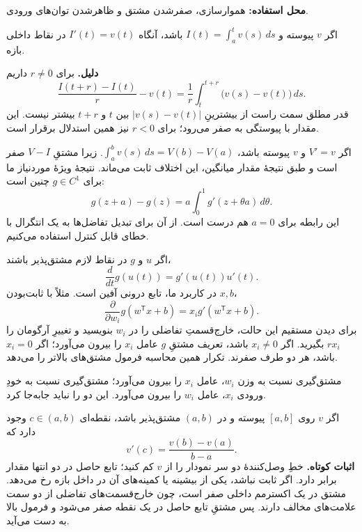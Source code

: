 \textbf{محل استفاده:} هموارسازی، صفرشدن مشتق و ظاهرشدن توان‌های ورودی.

اگر $v$ پیوسته و $I(t)=\int_a^t v(s)\,ds$ باشد، آنگاه $I'(t)=v(t)$ در نقاط داخلی بازه.

\textbf{دلیل.} برای $r\neq0$ داریم
\[
\frac{I(t+r)-I(t)}{r}-v(t)
=\frac1r\int_t^{t+r}\bigl(v(s)-v(t)\bigr)\,ds.
\]
قدر مطلق سمت راست از بیشترینِ $|v(s)-v(t)|$ بین $t$ و $t+r$ بیشتر نیست. این مقدار با پیوستگی به صفر می‌رود؛ برای $r<0$ نیز همین استدلال برقرار است.

اگر $V'=v$ و $v$ پیوسته باشد، $\int_a^b v(s)\,ds=V(b)-V(a)$. زیرا مشتقِ $V-I$ صفر است و طبق نتیجهٔ مقدار میانگین، این اختلاف ثابت می‌ماند. نتیجهٔ ویژهٔ موردنیاز ما برای $g\in C^1$ چنین است:
\begin{equation}\label{eq:ftc-difference}
 g(z+a)-g(z)=a\int_0^1g'(z+\theta a)\,d\theta.
\end{equation}
این رابطه برای $a=0$ هم درست است. از آن برای تبدیل تفاضل‌ها به یک انتگرال با خطای قابل کنترل استفاده می‌کنیم.

اگر $u$ و $g$ در نقاط لازم مشتق‌پذیر باشند،
\[
\frac{d}{dt}g(u(t))=g'(u(t))u'(t).
\]
در کاربرد ما، تابع درونی آفین است. مثلاً با ثابت‌بودن $x,b$،
\[
\frac{\partial}{\partial w_i}g(w^{\mathsf T}x+b)
=x_i g'(w^{\mathsf T}x+b).
\]
برای دیدن مستقیم این حالت، خارج‌قسمتِ تفاضلی را در $w_i$ بنویسید و تغییرِ آرگومان را $rx_i$ بگیرید. اگر $x_i\neq0$ باشد، تعریف مشتقِ $g$ عامل $x_i$ را بیرون می‌آورد؛ اگر $x_i=0$ باشد، هر دو طرف صفرند. تکرار همین محاسبه فرمول مشتق‌های بالاتر را می‌دهد.

\begin{intuition}
مشتق‌گیری نسبت به وزن $w_i$، عامل $x_i$ را بیرون می‌آورد؛ مشتق‌گیری نسبت به خودِ ورودی $x_i$، عامل $w_i$ را بیرون می‌آورد. این دو را نباید جابه‌جا کرد.
\end{intuition}

\clearpage
{}
اگر $v$ روی $[a,b]$ پیوسته و در $(a,b)$ مشتق‌پذیر باشد، نقطه‌ای $c\in(a,b)$ وجود دارد که
\[
v'(c)=\frac{v(b)-v(a)}{b-a}.
\]
\textbf{اثبات کوتاه.} خطِ وصل‌کنندهٔ دو سر نمودار را از $v$ کم کنید؛ تابع حاصل در دو انتها مقدار برابر دارد. اگر ثابت نباشد، یکی از بیشینه یا کمینه‌های آن در داخل بازه رخ می‌دهد. مشتق در یک اکسترمم داخلی صفر است، چون خارج‌قسمت‌های تفاضلی از دو سمت علامت‌های مخالف دارند. پس مشتقِ تابع حاصل در یک نقطه صفر می‌شود و فرمول بالا به دست می‌آید.

